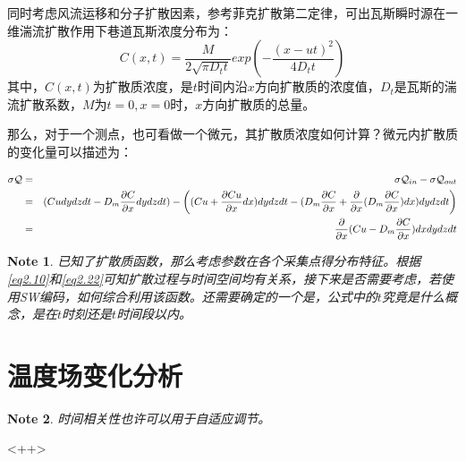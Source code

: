 \documentclass[UTF8]{ctexart}
\theoremstyle{plain}
\newtheorem{note}{Note}
\begin{document}
同时考虑风流运移和分子扩散因素，参考菲克扩散第二定律，可出瓦斯瞬时源在一维湍流扩散作用下巷道瓦斯浓度分布为：
\begin{equation}
    C(x,t) = \dfrac{M}{2\sqrt{\pi D_t t}}exp(-\dfrac{(x-ut)^2}{4D_t t})
    \label{eq2.22}
\end{equation}
其中，$C(x,t)$为扩散质浓度，是$t$时间内沿$x$方向扩散质的浓度值，$D_t$是瓦斯的湍流扩散系数，$M$为$t=0,x=0$时，$x$方向扩散质的总量。

那么，对于一个测点，也可看做一个微元，其扩散质浓度如何计算？微元内扩散质的变化量可以描述为：

\begin{eqnarray}
    \sigma \mathcal{Q} &=& \sigma \mathcal{Q}_{in} - \sigma \mathcal{Q}_{out} \notag \\
    &=& (Cudydzdt - D_m\dfrac{\partial C}{\partial x}dydzdt) - \left( (Cu+\dfrac{\partial Cu}{\partial x}dx)dydzdt-(D_m \dfrac{\partial C}{\partial x} + \dfrac{\partial}{\partial x}(D_m \dfrac{\partial C}{\partial x})dx)dydzdt \right) \notag \\
    &=& \dfrac{\partial}{\partial x}(Cu- D_m \dfrac{\partial C}{\partial x})dxdydzdt
    \label{eq-diffuseness}
\end{eqnarray}
 

\begin{note}
    已知了扩散质函数，那么考虑参数在各个采集点得分布特征。根据\cref{eq2.10}和\cref{eq2.22}可知扩散过程与时间空间均有关系，接下来是否需要考虑，若使用SW编码，如何综合利用该函数。还需要确定的一个是，公式中的$t$究竟是什么概念，是在$t$时刻还是$t$时间段以内。
\end{note}


\section{温度场变化分析}

\begin{note}
    时间相关性也许可以用于自适应调节。
\end{note}<++>


\end{document}
